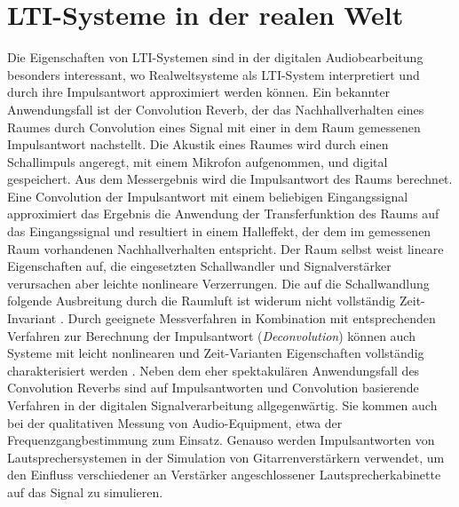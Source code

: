 \section{LTI-Systeme in der realen Welt}
\label{sec:irl_lti}
Die Eigenschaften von LTI-Systemen sind in der digitalen Audiobearbeitung besonders interessant, wo Realweltsysteme als LTI-System interpretiert
und durch ihre Impulsantwort approximiert werden können.
Ein bekannter Anwendungsfall ist der Convolution Reverb, der das Nachhallverhalten eines Raumes durch Convolution eines Signal mit einer in dem Raum
gemessenen Impulsantwort nachstellt. Die Akustik eines Raumes wird durch einen Schallimpuls angeregt, mit einem Mikrofon aufgenommen, und digital gespeichert. 
Aus dem Messergebnis wird die Impulsantwort des Raums berechnet. Eine Convolution der Impulsantwort mit einem beliebigen Eingangssignal approximiert das
Ergebnis die Anwendung der Transferfunktion des Raums auf das Eingangssignal und resultiert in einem Halleffekt, der dem im gemessenen Raum vorhandenen Nachhallverhalten entspricht.
Der Raum selbst weist lineare Eigenschaften auf, die eingesetzten Schallwandler und
Signalverstärker verursachen aber leichte nonlineare Verzerrungen. Die auf die Schallwandlung folgende Ausbreitung durch 
die Raumluft ist widerum nicht vollständig Zeit-Invariant \cite{farina2000,farina2007a,prawda2024}. 
Durch geeignete Messverfahren in Kombination mit entsprechenden Verfahren zur Berechnung der Impulsantwort (\textit{Deconvolution}) können auch Systeme mit leicht
nonlinearen und Zeit-Varianten Eigenschaften vollständig charakterisiert werden \cite{farina2000,farina2007a}. 
Neben dem eher spektakulären Anwendungsfall des Convolution Reverbs sind auf Impulsantworten und Convolution basierende Verfahren in der
digitalen Signalverarbeitung allgegenwärtig. Sie kommen auch bei der qualitativen Messung von Audio-Equipment, etwa der Frequenzgangbestimmung
zum Einsatz. Genauso werden Impulsantworten von Lautsprechersystemen in der Simulation von Gitarrenverstärkern verwendet, um den Einfluss
verschiedener an Verstärker angeschlossener Lautsprecherkabinette auf das Signal zu simulieren. 